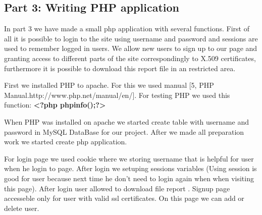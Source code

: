 \subsection {Part 3: Writing PHP application}


\noindent
In part 3 we have made a small php application with several functions. First of all it is possible to login to the site using username and password and sessions are used to remember logged in users. We allow new users to sign up to our page and granting access to different parts of the site correspondingly to X.509 certificates, furthermore it is possible to download this report file in an restricted area. \newline

\noindent
First we installed PHP to apache. For this  we used manual [5,  PHP Manual.http://www.php.net/manual/en/]. For testing PHP we used this function: {\bf <?php phpinfo();?>}
\newline

\noindent
When PHP was installed on apache we started  create table  with username and password  in MySQL DataBase for our project. After we made all preparation work we started create php application. 
\newline

\noindent
For login page we used cookie where we storing username that is helpful for user when he login to page. After login we setuping sessions variables (Using session is good for user because next time he don’t need to login again when when visiting this page). After login user allowed to download file report . Signup page accesseble  only for user with valid ssl certificates. On this page we can add or delete user.
\newline

